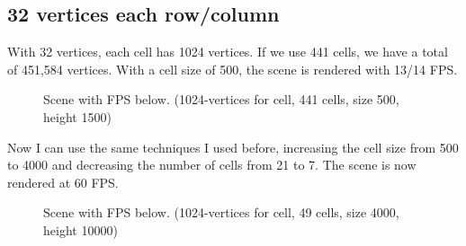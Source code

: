 \subsection{32 vertices each row/column}
With 32 vertices, each cell has 1024 vertices. If we use 441 cells, we have a total of 451,584 vertices. With a cell size of 500, the scene is rendered with 13/14 FPS.

\newpage

\begin{figure}[hbt!]
	\centering
	
	\noindent{}
	
	\caption{Scene with FPS below. (1024-vertices for cell, 441 cells, size 500, height 1500)}
\end{figure} 

\noindent
Now I can use the same techniques I used before, increasing the cell size from 500 to 4000 and decreasing the number of cells from 21 to 7. The scene is now rendered at 60 FPS.
\newpage

\begin{figure}[hbt!]
	\centering
	
	\noindent{}
	
	\caption{Scene with FPS below. (1024-vertices for cell, 49 cells, size 4000, height 10000)}
\end{figure} 

